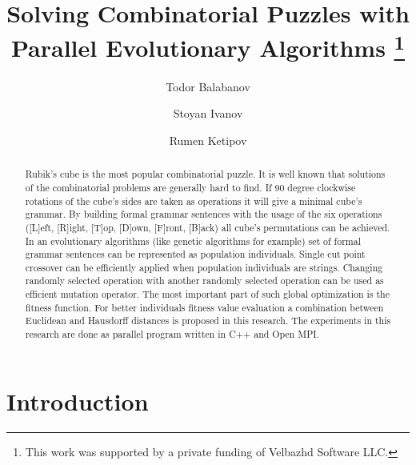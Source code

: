 \documentclass[runningheads]{llncs}
\begin{document}
\title{Solving Combinatorial Puzzles with Parallel Evolutionary Algorithms \thanks{This work was supported by a private funding of Velbazhd Software LLC.}}

\author{Todor Balabanov \and
Stoyan Ivanov \and
Rumen Ketipov}


\maketitle

\begin{abstract}
Rubik's cube is the most popular combinatorial puzzle. It is well known that solutions of the combinatorial problems are generally hard to find. If 90 degree clockwise rotations of the cube's sides are taken as operations it will give a minimal cube's grammar. By building formal grammar sentences with the usage of the six operations ([L]eft, [R]ight, [T]op, [D]own, [F]ront, [B]ack) all cube's permutations can be achieved. In an evolutionary algorithms (like genetic algorithms for example) set of formal grammar sentences can be represented as population individuals. Single cut point crossover can be efficiently applied when population individuals are strings. Changing randomly selected operation with another randomly selected operation can be used as efficient mutation operator. The most important part of such global optimization is the fitness function. For better individuals fitness value evaluation a combination between Euclidean and Hausdorff distances is proposed in this research. The experiments in this research are done as parallel program written in C++ and Open MPI.

\end{abstract}

\section{Introduction}
\end{document}
